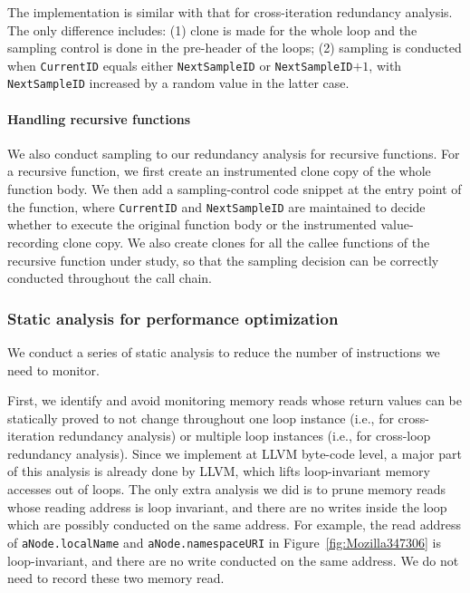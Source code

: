 The implementation is similar with that for cross-iteration redundancy analysis.
The only difference includes: (1) clone is made for the whole loop and the
sampling control
is done in the pre-header of the loops; (2)
sampling is conducted when \texttt{CurrentID} equals either
\texttt{NextSampleID} or \texttt{NextSampleID}$+1$, with \texttt{NextSampleID}
increased by a random value in the latter case.




\paragraph{Handling recursive functions}
We also conduct sampling to our redundancy analysis for recursive functions.
For a recursive function, we first create an instrumented clone copy of 
the whole function body.
We then add a sampling-control code snippet at the entry point of the function,
where \texttt{CurrentID} and \texttt{NextSampleID} are maintained to decide
whether to execute the original function body or the instrumented 
value-recording clone copy.
We also create clones for all the callee functions of the recursive function
under study, so that the sampling decision can be correctly conducted
throughout the call chain.

\subsubsection{Static analysis for performance optimization}
\label{sec:perf}

We conduct a series of static analysis to reduce the number of instructions we 
need to monitor. 

First, we identify and avoid monitoring memory reads whose return values can be 
statically proved to
not change throughout one loop instance (i.e., for cross-iteration
redundancy analysis) or multiple loop instances (i.e., for cross-loop redundancy
analysis). Since we implement \Tool at LLVM byte-code level, a major part of this
analysis is already done by LLVM, which lifts loop-invariant memory
accesses out of loops. The only extra analysis we did is to 
prune memory reads whose reading address is loop invariant, and there are no writes 
inside the loop which are possibly conducted on the same address. 
For example, the read address of \texttt{aNode.localName} and \texttt{aNode.namespaceURI}
in Figure~\ref{fig:Mozilla347306} is loop-invariant, and there are no write conducted 
on the same address. We do not need to record these two memory read. 

